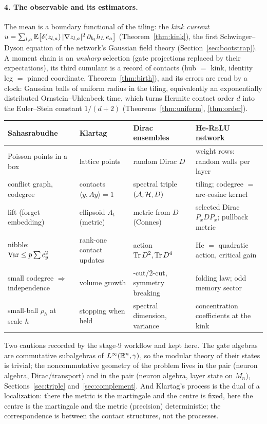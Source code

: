 \paragraph{4. The observable and its estimators.} The mean is a boundary functional of the tiling: the
\emph{kink current} $u=\sum_{l,a}\mathbb E\big[\delta(z_{l,a})\,|\nabla z_{l,a}|^2\,\partial_{h_l}h_L\,e_a\big]$
(Theorem~\ref{thm:kink}), the first Schwinger--Dyson equation of the network's Gaussian field theory
(Section~\ref{sec:bootstrap}). A moment chain is an \emph{unsharp} selection (gate projections replaced by their
expectations), its third cumulant is a record of contacts (hub $=$ kink, identity leg $=$ pinned coordinate,
Theorem~\ref{thm:birth}), and its errors are read by a clock: Gaussian balls of uniform radius in the tiling,
equivalently an exponentially distributed Ornstein--Uhlenbeck time, which turns Hermite contact order $d$ into the
Euler--Stein constant $1/(d+2)$ (Theorems~\ref{thm:uniform}, \ref{thm:order}).

\begin{center}\small
\begin{tabular}{>{\raggedright\arraybackslash}p{3.5cm}>{\raggedright\arraybackslash}p{3.5cm}>{\raggedright\arraybackslash}p{3.6cm}>{\raggedright\arraybackslash}p{4.0cm}}\toprule
Sahasrabudhe \cite{survey} & Klartag \cite{klartag} & Dirac ensembles \cite{BG,KP,DG,BDG} & He-\textsc{ReLU} network\\\midrule
Poisson points in a box & lattice points & random Dirac $D$ & weight rows: random walls per layer\\
conflict graph, codegree & contacts $\langle y,Ay\rangle=1$ & spectral triple $(\mathcal A,\mathcal H,D)$ & tiling; codegree $=$ arc-cosine kernel\\
lift (forget embedding) & ellipsoid $A_t$ (metric) & metric from $D$ (Connes) & selected Dirac $P_xDP_x$; pullback metric\\
nibble: $\operatorname{Var}\le p\sum c_y^2$ & rank-one contact updates & action $\operatorname{Tr} D^2,\operatorname{Tr} D^4$ & He $=$ quadratic action, critical gain\\
small codegree $\Rightarrow$ independence & volume growth & 1-cut/2-cut, symmetry breaking & folding law; odd memory sector\\
small-ball $\rho_h$ at scale $h$ & stopping when held & spectral dimension, variance & concentration coefficients at the kink\\
\bottomrule\end{tabular}
\end{center}
Two cautions recorded by the stage-9 workflow and kept here. The gate algebras are commutative subalgebras of
$L^\infty(\mathbb R^n,\gamma)$, so the modular theory of their states is trivial; the noncommutative geometry of the
problem lives in the pair (neuron algebra, Dirac/transport) and in the pair (neuron algebra, layer state on $M_n$),
Sections~\ref{sec:triple} and~\ref{sec:complement}. And Klartag's process is the dual of a localization: there the
metric is the martingale and the centre is fixed, here the centre is the martingale and the metric (precision)
deterministic; the correspondence is between the contact structures, not the processes.

